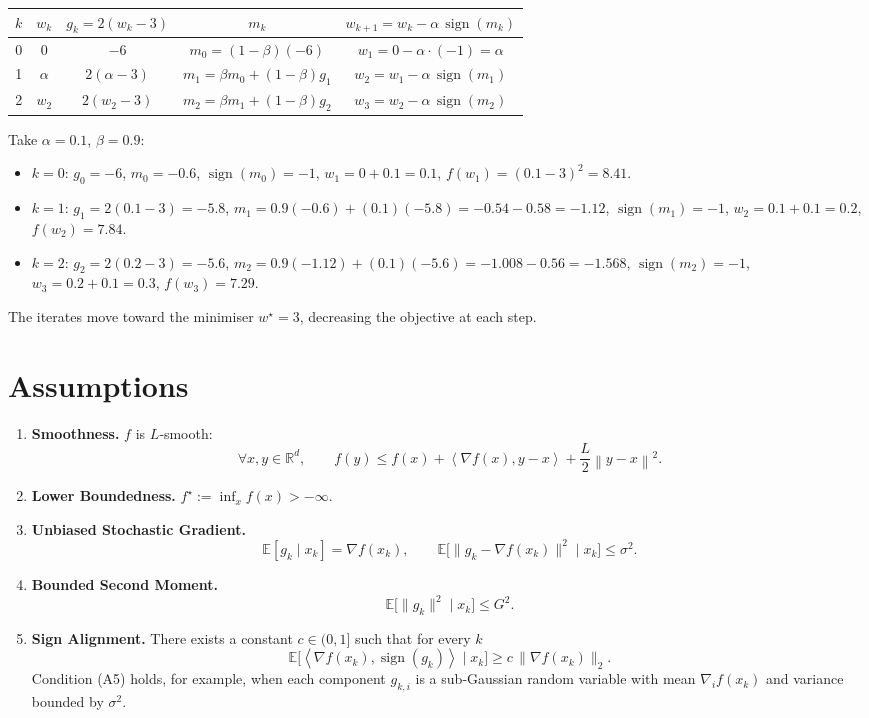 \documentclass{article}
\newcommand{\sign}{\operatorname{sign}}
\newcommand{\E}{\mathbb{E}}
\newcommand{\R}{\mathbb{R}}
\newcommand{\norm}[1]{\left\lVert#1\right\rVert}
\newcommand{\inner}[2]{\left\langle #1,#2\right\rangle}
\begin{document}
\begin{center}
\begin{tabular}{c|c|c|c|c}
$k$ & $w_k$ & $g_k=2(w_k-3)$ & $m_k$ & $w_{k+1}=w_k-\alpha\,\sign(m_k)$\\ \hline
0 & $0$ & $-6$ & $m_0=(1-\beta)(-6)$ & $w_1=0-\alpha\cdot(-1)=\alpha$\\[2pt]
1 & $\alpha$ & $2(\alpha-3)$ & $m_1=\beta m_0+(1-\beta)g_1$ & $w_2=w_1-\alpha\,\sign(m_1)$\\[2pt]
2 & $w_2$ & $2(w_2-3)$ & $m_2=\beta m_1+(1-\beta)g_2$ & $w_3=w_2-\alpha\,\sign(m_2)$
\end{tabular}
\end{center}
Take $\alpha=0.1$, $\beta=0.9$:

\begin{itemize}
\item $k=0$: $g_0=-6$, $m_0=-0.6$, $\sign(m_0)=-1$, $w_1=0+0.1=0.1$, $f(w_1)= (0.1-3)^2=8.41$.
\item $k=1$: $g_1=2(0.1-3)=-5.8$, $m_1=0.9(-0.6)+(0.1)(-5.8)=-0.54-0.58=-1.12$, $\sign(m_1)=-1$, $w_2=0.1+0.1=0.2$, $f(w_2)=7.84$.
\item $k=2$: $g_2=2(0.2-3)=-5.6$, $m_2=0.9(-1.12)+(0.1)(-5.6)=-1.008-0.56=-1.568$, $\sign(m_2)=-1$, $w_3=0.2+0.1=0.3$, $f(w_3)=7.29$.
\end{itemize}
The iterates move toward the minimiser $w^\star=3$, decreasing the objective at each step.

\newpage
\section*{Assumptions}
\begin{enumerate}[label={A\arabic*.}, leftmargin=*, itemsep=2pt]
\item \textbf{Smoothness.} $f$ is $L$‑smooth:
\[
\forall x,y\in\R^{d},\qquad 
f(y)\le f(x)+\inner{\nabla f(x)}{y-x}+\frac{L}{2}\norm{y-x}^{2}. \tag{A1}
\]

\item \textbf{Lower Boundedness.} $f^\star:=\inf_{x}f(x)>-\infty$. 

\item \textbf{Unbiased Stochastic Gradient.}
\[
\E[g_k\mid x_k]=\nabla f(x_k),\qquad 
\E\big[\|g_k-\nabla f(x_k)\|^{2}\mid x_k\big]\le\sigma^{2}. \tag{A3}
\]

\item \textbf{Bounded Second Moment.}
\[
\E\big[\|g_k\|^{2}\mid x_k\big]\le G^{2}. \tag{A4}
\]

\item \textbf{Sign Alignment.} There exists a constant $c\in(0,1]$ such that for every $k$
\[
\E\big[\inner{\nabla f(x_k)}{\sign(g_k)}\mid x_k\big]\ge c\,\|\nabla f(x_k)\|_{2}. \tag{A5}
\]
Condition (A5) holds, for example, when each component $g_{k,i}$ is a sub‑Gaussian
random variable with mean $\nabla_i f(x_k)$ and variance bounded by $\sigma^{2}$.
\end{enumerate}
\end{document}
